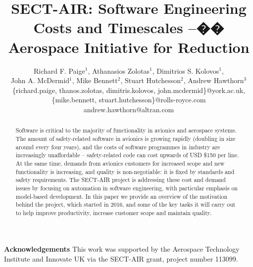 \documentclass[runningheads,a4paper]{llncs}
\begin{document}
\title{SECT-AIR: Software Engineering Costs and Timescales --�� Aerospace Initiative for Reduction}

\author{Richard F. Paige$^{1}$, Athanasios Zolotas$^{1}$, Dimitrios S. Kolovos$^{1}$, \\ John A. McDermid$^{1}$,
Mike Bennett$^{2}$, Stuart Hutchesson$^{2}$, Andrew Hawthorn$^{3}$\\%
%
\footnotesize{
\{richard.paige, thanos.zolotas, dimitris.kolovos, john.mcdermid\}@york.ac.uk, \\
\{mike.bennett, stuart.hutchesson\}@rolls-royce.com\\
andrew.hawthorn@altran.com
}
%
}

\maketitle

\begin{abstract}
Software is critical to the majority of functionality in avionics and aerospace systems. The amount of safety-related software in avionics is growing rapidly (doubling in size around every four years), and the costs of software programmes in industry are increasingly unaffordable -- safety-related code can cost upwards of USD \$150 per line. At the same time, demands from avionics customers for increased scope and new functionality is increasing, and quality is non-negotiable: it is fixed by standards and safety requirements. The SECT-AIR project is addressing these cost and demand issues by focusing on automation in software engineering, with particular emphasis on model-based development. In this paper we provide an overview of the motivation behind the project, which started in 2016, and some of the key tasks it will carry out to help improve productivity, increase customer scope and maintain quality.
\end{abstract}












\paragraph*{}\textbf{Acknowledgements} This work was supported by the Aerospace Technology Institute and Innovate UK via the SECT-AIR grant, project number 113099.


\end{document}
